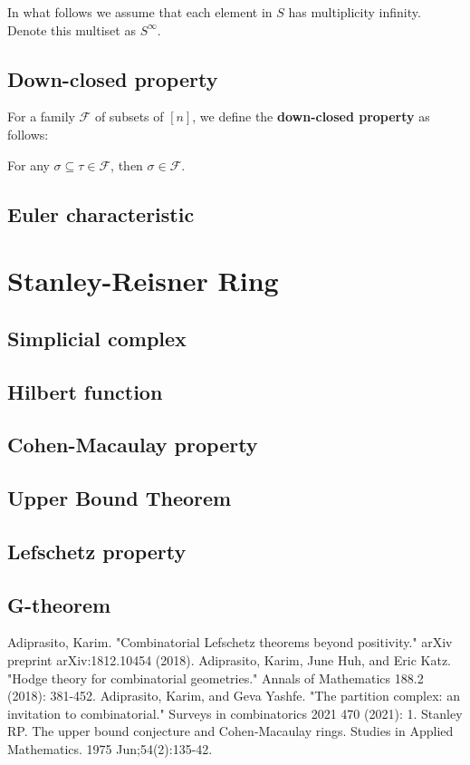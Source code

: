 \documentclass[12pt]{article}
\theoremstyle{definition}  %
\numberwithin{equation}{subsection}
\begin{document}
In what follows we assume that each element in $S$ has multiplicity infinity. Denote this multiset as $S^{\infty}$.

\subsection{Down-closed property}
For a family $\mathcal{F}$ of subsets of $[n]$, we define the \textbf{down-closed property} as follows:
\begin{center}
    For any $\sigma \subseteq \tau \in \mathcal{F}$, then $\sigma \in \mathcal{F}$.
\end{center}

\subsection{Euler characteristic}


\section{Stanley-Reisner Ring}
\subsection{Simplicial complex}

\subsection{Hilbert function}

\subsection{Cohen-Macaulay property}

\subsection{Upper Bound Theorem}

\subsection{Lefschetz property}

\subsection{G-theorem}

\begin{thebibliography}{99}
Adiprasito, Karim. "Combinatorial Lefschetz theorems beyond positivity." arXiv preprint arXiv:1812.10454 (2018).
 Adiprasito, Karim, June Huh, and Eric Katz. "Hodge theory for combinatorial geometries." Annals of Mathematics 188.2 (2018): 381-452.
 Adiprasito, Karim, and Geva Yashfe. "The partition complex: an invitation to combinatorial." Surveys in combinatorics 2021 470 (2021): 1.
 Stanley RP. The upper bound conjecture and Cohen‐Macaulay rings. Studies in Applied Mathematics. 1975 Jun;54(2):135-42.



\end{thebibliography}
\end{document}
